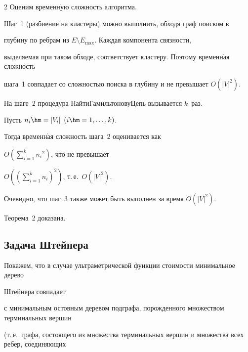 \begin{multicols}{2}
Оценим временн$\acute{\mbox{у}}$ю сложность алгоритма.


Шаг~1 (разбиение на кластеры) можно выполнить, обходя граф поиском в


глубину по ребрам из $E \setminus E_{\max}$. Каждая компонента связности,


выделяемая при таком обходе, соответствует кластеру. Поэтому временн$\acute{\mbox{а}}$я сложность


шага~1 совпадает со сложностью поиска в глубину и не превышает $O(|V|^2)$.





На шаге~2 процедура {\sf НайтиГамильтоновуЦепь} вызывается $k$~раз.


Пусть $n_i \hm= |V_i|$ $(i\hm=1,\ldots,k)$.


Тогда временн$\acute{\mbox{а}}$я сложность шага~2 оценивается как


$O\left(\sum\limits_{i=1}^{k} {n_i}^2\right)$, что не превышает


$O\left(\left(\sum\limits_{i=1}^{k} {n_i}\right)^2\right)$, т.\,е.\ $O\left(|V|^2\right)$.


Очевидно, что шаг~3 также может быть выполнен за время $O(|V|^2)$.


Теорема~2 доказана.













\subsection{Задача Штейнера}










Покажем, что в случае ультраметрической функции стоимости минимальное дерево


Штейнера совпадает


с минимальным остовным деревом подграфа, порожденного множеством терминальных вершин


(т.\,е.\ графа, состоящего из множества терминальных вершин и множества всех ребер, соединяющих



\end{multicols}
